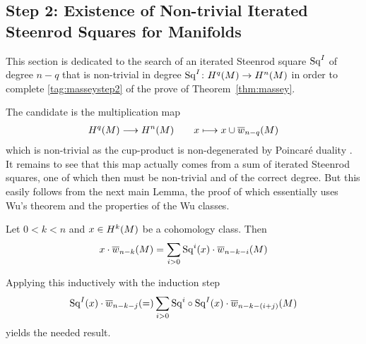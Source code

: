 \subsection[Non-trivial Iterated Steenrod Squares for Manifolds]
{Step 2: Existence of Non-trivial Iterated Steenrod Squares for Manifolds}

This section is dedicated to the search of an iterated Steenrod square
$\mathrm{Sq}^{I}$ of degree $n-q$ that is non-trivial in degree
$\mathrm{Sq}^{I}\colon H^q(M)\to H^n(M)$ in order to complete
\ref{tag:masseystep2} of the prove of Theorem~\autoref{thm:massey}.

The candidate is the multiplication map
\begin{gather*}
  H^q(M) \longrightarrow H^n(M)
  \qquad
  x\longmapsto x\cup{\overline{w}_{n-q}}(M)
\end{gather*}
which is non-trivial as the cup-product is non-degenerated
by Poincaré duality \cite[Proposition~3.38]{hatcher}.
It remains to see that this map actually comes from a sum of
iterated Steenrod squares, one of which then must be non-trivial and
of the correct degree.
But this easily follows from the next main Lemma,
the proof of which essentially uses Wu's theorem and the properties of
the Wu classes.

\begin{Lem}\label{lem:masseystep2}
  Let $0<k<n$ and $x\in H^k(M)$ be a cohomology class.
  Then
  \begin{gather*}
    x\cdot{\overline{w}_{n-k}}(M) = \sum_{i>0}\mathrm{Sq}^{i}(x)\cdot{\overline{w}_{n-k-i}}(M)
  \end{gather*}
\end{Lem}
Applying this inductively with the induction step
\begin{gather*}
  \mathrm{Sq}^{I}(x)\cdot{\overline{w}_{n-k-j}}(=) \sum_{i>0}\mathrm{Sq}^{i}\circ\mathrm{Sq}^{I}(x)\cdot{\overline{w}_{n-k-(i+j)}}(M)
\end{gather*}
yields the needed result.

